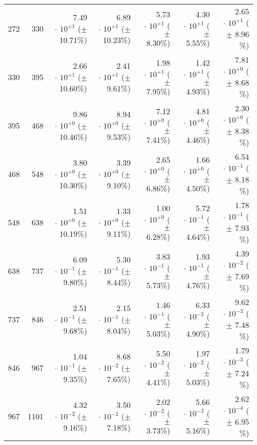 \begin{table}[h!]
\begin{center}
\begin{tabular}{|r|r|r|r|r|r|r|}
 272 &  330 & 7.49$\,\cdot\, 10^{+1}$  ($\pm\!\!$ 10.71\%) & 6.89$\,\cdot\, 10^{+1}$  ($\pm\!\!$ 10.23\%) & 5.73$\,\cdot\, 10^{+1}$  ($\pm\!\!$  8.30\%) & 4.30$\,\cdot\, 10^{+1}$  ($\pm\!\!$  5.55\%) & 2.65$\,\cdot\, 10^{+1}$  ($\pm\!\!$  8.96 \%)\\
 330 &  395 & 2.66$\,\cdot\, 10^{+1}$  ($\pm\!\!$ 10.60\%) & 2.41$\,\cdot\, 10^{+1}$  ($\pm\!\!$  9.61\%) & 1.98$\,\cdot\, 10^{+1}$  ($\pm\!\!$  7.95\%) & 1.42$\,\cdot\, 10^{+1}$  ($\pm\!\!$  4.93\%) & 7.81$\,\cdot\, 10^{+0}$  ($\pm\!\!$  8.68 \%)\\
 395 &  468 & 9.86$\,\cdot\, 10^{+0}$  ($\pm\!\!$ 10.46\%) & 8.94$\,\cdot\, 10^{+0}$  ($\pm\!\!$  9.53\%) & 7.12$\,\cdot\, 10^{+0}$  ($\pm\!\!$  7.41\%) & 4.81$\,\cdot\, 10^{+0}$  ($\pm\!\!$  4.46\%) & 2.30$\,\cdot\, 10^{+0}$  ($\pm\!\!$  8.38 \%)\\
 468 &  548 & 3.80$\,\cdot\, 10^{+0}$  ($\pm\!\!$ 10.30\%) & 3.39$\,\cdot\, 10^{+0}$  ($\pm\!\!$  9.10\%) & 2.65$\,\cdot\, 10^{+0}$  ($\pm\!\!$  6.86\%) & 1.66$\,\cdot\, 10^{+0}$  ($\pm\!\!$  4.50\%) & 6.54$\,\cdot\, 10^{-1}$  ($\pm\!\!$  8.18 \%)\\
 548 &  638 & 1.51$\,\cdot\, 10^{+0}$  ($\pm\!\!$ 10.19\%) & 1.33$\,\cdot\, 10^{+0}$  ($\pm\!\!$  9.11\%) & 1.00$\,\cdot\, 10^{+0}$  ($\pm\!\!$  6.28\%) & 5.72$\,\cdot\, 10^{-1}$  ($\pm\!\!$  4.64\%) & 1.78$\,\cdot\, 10^{-1}$  ($\pm\!\!$  7.93 \%)\\
 638 &  737 & 6.09$\,\cdot\, 10^{-1}$  ($\pm\!\!$  9.80\%) & 5.30$\,\cdot\, 10^{-1}$  ($\pm\!\!$  8.44\%) & 3.83$\,\cdot\, 10^{-1}$  ($\pm\!\!$  5.73\%) & 1.93$\,\cdot\, 10^{-1}$  ($\pm\!\!$  4.76\%) & 4.39$\,\cdot\, 10^{-2}$  ($\pm\!\!$  7.69 \%)\\
 737 &  846 & 2.51$\,\cdot\, 10^{-1}$  ($\pm\!\!$  9.68\%) & 2.15$\,\cdot\, 10^{-1}$  ($\pm\!\!$  8.04\%) & 1.46$\,\cdot\, 10^{-1}$  ($\pm\!\!$  5.03\%) & 6.33$\,\cdot\, 10^{-2}$  ($\pm\!\!$  4.90\%) & 9.62$\,\cdot\, 10^{-3}$  ($\pm\!\!$  7.48 \%)\\
 846 &  967 & 1.04$\,\cdot\, 10^{-1}$  ($\pm\!\!$  9.35\%) & 8.68$\,\cdot\, 10^{-2}$  ($\pm\!\!$  7.65\%) & 5.50$\,\cdot\, 10^{-2}$  ($\pm\!\!$  4.41\%) & 1.97$\,\cdot\, 10^{-2}$  ($\pm\!\!$  5.03\%) & 1.79$\,\cdot\, 10^{-3}$  ($\pm\!\!$  7.24 \%)\\
 967 & 1101 & 4.32$\,\cdot\, 10^{-2}$  ($\pm\!\!$  9.16\%) & 3.50$\,\cdot\, 10^{-2}$  ($\pm\!\!$  7.18\%) & 2.02$\,\cdot\, 10^{-2}$  ($\pm\!\!$  3.73\%) & 5.66$\,\cdot\, 10^{-3}$  ($\pm\!\!$  5.16\%) & 2.62$\,\cdot\, 10^{-4}$  ($\pm\!\!$  6.95 \%)\\

\end{tabular}
\end{center}
\end{table}
